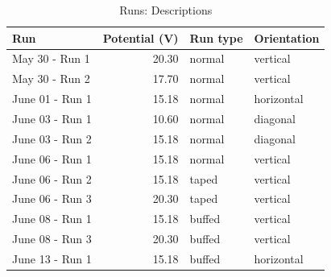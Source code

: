 \documentclass[letterpaper,titlepage,oneside]{report}
\begin{document}
\begin{table}[ht]
  \caption{Runs: Descriptions}
  \label{tab:runsdescriptions}
  \centering
  \begin{tabularx}{\textwidth}{|X|r|X|X|}
    \hline
    Run & Potential (V) & Run type & Orientation \\
    \hline
    May  30 - Run 1   &   20.30   &   normal   &    vertical  \\
    May  30 - Run 2   &   17.70   &   normal   &    vertical  \\
    June 01 - Run 1   &   15.18   &   normal   &    horizontal  \\
    June 03 - Run 1   &   10.60   &   normal   &    diagonal  \\
    June 03 - Run 2   &   15.18   &   normal   &    diagonal  \\
    June 06 - Run 1   &   15.18   &   normal   &    vertical  \\
    June 06 - Run 2   &   15.18   &   taped    &    vertical  \\
    June 06 - Run 3   &   20.30   &   taped    &    vertical  \\
    June 08 - Run 1   &   15.18   &   buffed   &    vertical  \\
    June 08 - Run 3   &   20.30   &   buffed   &    vertical  \\
    June 13 - Run 1   &   15.18   &   buffed   &    horizontal  \\
    \hline
  \end{tabularx}
\end{table}
\end{document}
